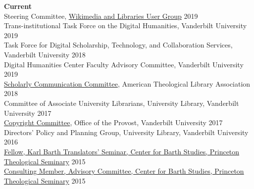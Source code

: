 \documentclass[10pt]{res} %
\begin{document}
\begin{resume}
{\bf Current} \\
Steering Committee, \href{https://meta.wikimedia.org/wiki/Wikimedia_and_Libraries_User_Group}{Wikimedia and Libraries User Group} \hfill 2019\\ 
Trans-institutional Task Force on the Digital Humanities, Vanderbilt University \hfill 2019\\
Task Force for Digital Scholarship, Technology, and Collaboration Services, Vanderbilt University \hfill 2018\\
Digital Humanities Center Faculty Advisory Committee, Vanderbilt University \hfill 2019\\
\href{https://www.atla.com/about/committees-councils-task-forces/scholarly-communication-committee/}{Scholarly Communication Committee}, American Theological Library Association \hfill 2018\\
Committee of Associate University Librarians, University Library, Vanderbilt University \hfill 2017\\
\href{https://vanderbilt.edu/provost/people/cyrus/committees/copyright-committee.php}{Copyright Committee}, Office of the Provost, Vanderbilt University \hfill 2017\\
Directors' Policy and Planning Group, University Library, Vanderbilt University \hfill 2016\\
\href{http://barth.ptsem.edu/event/translators-seminar}{Fellow, Karl Barth Translators’ Seminar, Center for Barth Studies, Princeton Theological Seminary} \hfill 2015\\
\href{http://barth.ptsem.edu/about-cbs/the-advisory-committee}{Consulting Member, Advisory Committee, Center for Barth Studies, Princeton Theological Seminary}  \hfill 2015 \\


\end{resume}
\end{document}
